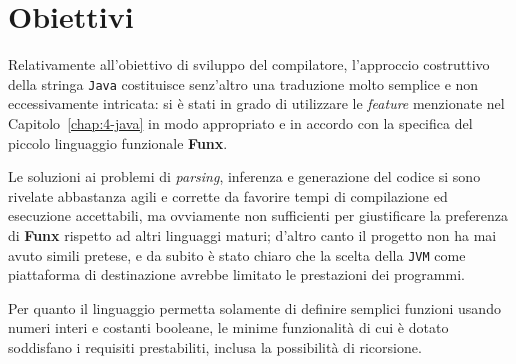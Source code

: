 \section{Obiettivi}
\label{sec:6-1-objectives}

Relativamente all'obiettivo di sviluppo del compilatore, l'approccio costruttivo della stringa \texttt{Java}
costituisce senz'altro una traduzione molto semplice e non eccessivamente intricata:
si è stati in grado di utilizzare le \textit{feature} menzionate nel Capitolo~\ref{chap:4-java} in modo
appropriato e in accordo con la specifica del piccolo linguaggio funzionale \textbf{Funx}.


Le soluzioni ai problemi di \textit{parsing}, inferenza e generazione del codice si sono rivelate abbastanza
agili e corrette da favorire tempi di compilazione ed esecuzione accettabili, ma ovviamente non sufficienti
per giustificare la preferenza di \textbf{Funx} rispetto ad altri linguaggi maturi;
d'altro canto il progetto non ha mai avuto simili pretese, e da subito è stato chiaro che la scelta della \texttt{JVM}
come piattaforma di destinazione avrebbe limitato le prestazioni dei programmi.


Per quanto il linguaggio permetta solamente di definire semplici funzioni usando numeri interi e costanti booleane,
le minime funzionalità di cui è dotato soddisfano i requisiti prestabiliti, inclusa la possibilità di ricorsione. 